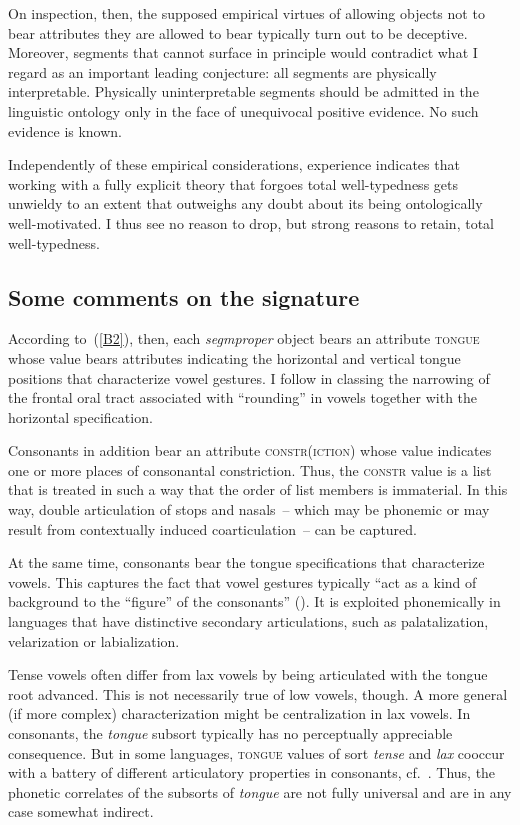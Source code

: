 \documentclass[output=paper]{langsci/langscibook}
\begin{document}
On inspection, then, the supposed empirical virtues of allowing objects not
to bear attributes they are allowed to bear typically turn out to be
deceptive. Moreover, segments that cannot surface in principle would
contradict what I regard as an important leading conjecture: all segments
are physically interpretable.  Physically uninterpretable segments should
be admitted in the linguistic ontology only in the face of unequivocal
positive evidence. No such evidence is known.

Independently of these empirical considerations, experience indicates that
working with a fully explicit theory that forgoes total well-typedness gets
unwieldy to an extent that outweighs any doubt about its being
ontologically well-motivated. I thus see no reason to drop, but strong
reasons to retain, total well-typedness.



\subsection{Some comments on the signature}
\label{sec:1.2.3}

According to~(\ref{B2}), then, each \textit{segmproper} object bears an
attribute \textsc{tongue} whose value bears attributes indicating the
horizontal and vertical tongue positions that characterize vowel gestures.
I follow \cite{odde:94} in classing the narrowing of the
frontal oral tract associated with ``rounding'' in vowels together with the
horizontal specification.

Consonants in addition bear an attribute \textsc{constr(iction)} whose value
indicates one or more places of consonantal constriction.  Thus, the \textsc{constr} value is a list that is treated in such a way that the order of
list members is immaterial. In this way, double articulation of stops and
nasals~-- which may be phonemic or may result from contextually induced
coarticulation~-- can be captured.

At the same time, consonants bear the tongue specifications that
characterize vowels. This captures the fact that vowel gestures typically
``act as a kind of background to the ``figure'' of the consonants''
(\citealt[354]{bro:gol:90}).
It is exploited phonemically in languages that have distinctive secondary
articulations, such as palatalization, velarization or labialization.

Tense vowels often differ from lax vowels by being articulated with the
tongue root advanced. This is not necessarily true of low vowels, though.
A more general (if more complex) characterization might be centralization
in lax vowels.  In consonants, the \textit{tongue}\/ subsort typically has no
perceptually appreciable consequence. But in some languages, \textsc{tongue}
values of sort \textit{tense}\/ and \textit{lax}\/ cooccur with a battery of
different articulatory properties in consonants,
cf.\ \cite{loc:lod:96}. Thus, the phonetic
correlates of the subsorts of \textit{tongue}\/ are not fully universal and
are in any case somewhat indirect.
\end{document}
